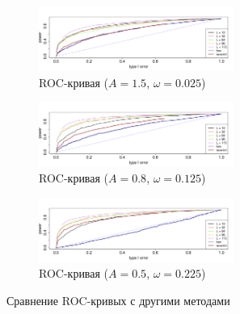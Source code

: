 \documentclass[specialist,
substylefile = spbu_report.rtx,
subf,href,colorlinks=true, 12pt]{disser}
\theoremstyle{definition}
\begin{document}
\begin{figure}[h!]
	\begin{subfigure}[t]{\textwidth}
		\centering
		\includegraphics[width=0.7\textwidth]{img/roc_testAR_omega0025.pdf}
		\caption{ROC-кривая ($A=1.5$, $\omega=0.025$)}
		\label{roc_testAR_omega0025}
	\end{subfigure}
	\begin{subfigure}[t]{\textwidth}
		\centering
		\includegraphics[width=0.7\textwidth]{img/roc_testAR_omega0125.pdf}
		\caption{ROC-кривая ($A=0.8$, $\omega=0.125$)}
		\label{roc_testAR_omega0125}
	\end{subfigure}
	\begin{subfigure}[t]{\textwidth}
		\centering
		\includegraphics[width=0.7\textwidth]{img/roc_testAR_omega0225.pdf}
		\caption{ROC-кривая ($A=0.5$, $\omega=0.225$)}
		\label{roc_testAR_omega0225}
	\end{subfigure}
	\caption{Сравнение ROC-кривых с другими методами}
\end{figure}
\end{document}
